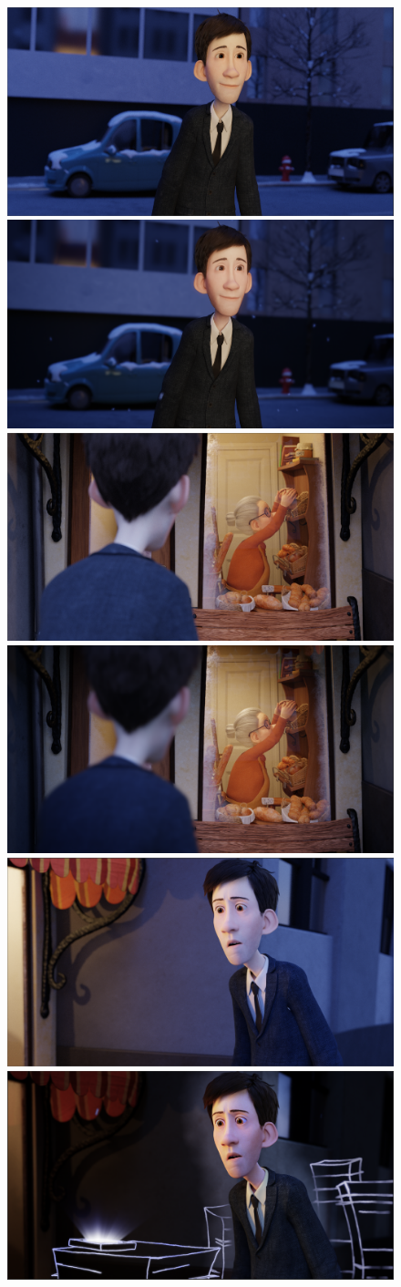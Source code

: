 \documentclass[11pt]{article}
\begin{document}
\begin{figure}[htbp]
\centering
\includegraphics[width=0.48\linewidth]{images/shot020_precomp.png}
\hfill
\includegraphics[width=0.48\linewidth]{images/shot020_comp.png}
\newline
\newline
\includegraphics[width=0.48\linewidth]{images/shot030_precomp.png}
\hfill
\includegraphics[width=0.48\linewidth]{images/shot030_comp.png}
\newline
\newline
\includegraphics[width=0.48\linewidth]{images/shot040_precomp.png}
\hfill
\includegraphics[width=0.48\linewidth]{images/shot040_comp.png}

\end{figure}
\end{document}

